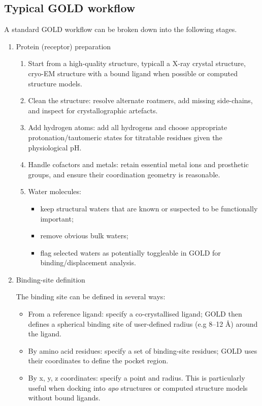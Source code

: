 \documentclass[12pt, a4paper]{article}
\begin{document}
\subsection{Typical GOLD workflow}

A standard GOLD workflow can be broken down into the following stages.
\begin{enumerate}
  \item Protein (receptor) preparation
\begin{enumerate}
    \item Start from a high-quality structure, typicall a X-ray crystal structure, cryo-EM structure with a bound ligand when possible or computed structure models.
    \item Clean the structure: resolve alternate roatmers, add missing side-chains, and inspect for crystallographic artefacts.
    \item Add hydrogen atoms: add all hydrogens and choose appropriate protonation/tautomeric states for titratable residues given the physiological pH.
    \item Handle cofactors and metals: retain essential metal ions and prosthetic groups, and ensure their coordination geometry is reasonable.
    \item Water molecules:
    \begin{itemize}
        \item keep structural waters that are known or suspected to be functionally important;
        \item remove obvious bulk waters;
        \item flag selected waters as potentially toggleable in GOLD for binding/displacement analysis.
    \end{itemize}
\end{enumerate}

\item Binding-site definition

The binding site can be defined in several ways:
\begin{itemize}
    \item From a reference ligand: specify a co-crystallised ligand; GOLD then defines a spherical binding site of user-defined radius (e.g 8--12 \r{A}) around the ligand.
    \item By amino acid residues: specify a set of binding-site residues; GOLD uses their coordinates to define the pocket region.
    \item By x, y, z coordinates: specify a point and radius. This is particularly useful when docking into \textit{apo} structures or computed structure models without bound ligands.
\end{itemize}


\end{enumerate}
\end{document}
